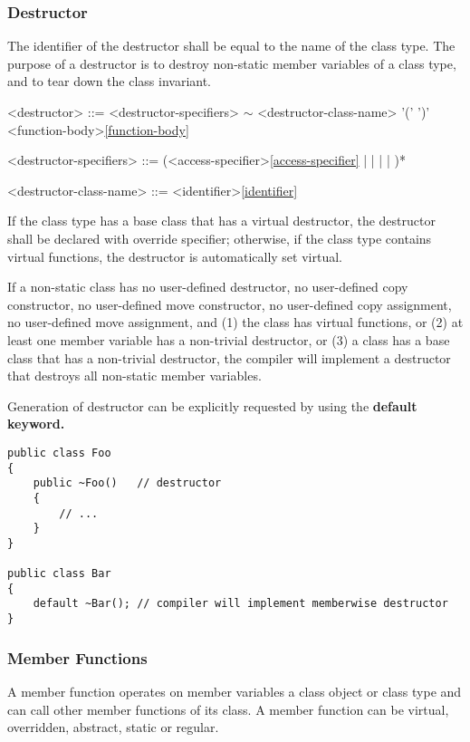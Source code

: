 \documentclass[a4paper,oneside,11pt]{article}
\begin{document}
\subsubsection{Destructor}

The identifier of the destructor shall be equal to the name of the class type.
The purpose of a destructor is to destroy non-static member variables of a class type,
and to tear down the class invariant.

\begin{grammar}
\label{destructor}<destructor> ::= <destructor-specifiers> $\sim$ <destructor-class-name> '(' ')' <function-body>\ref{function-body}

<destructor-specifiers> ::= (<access-specifier>\ref{access-specifier} |  |  |  | )*

<destructor-class-name> ::= <identifier>\ref{identifier}
\end{grammar}

If the class type has a base class that has a virtual destructor, the destructor shall be declared with override specifier;
otherwise, if the class type contains virtual functions, the destructor is automatically set virtual.

If a non-static class has no user-defined destructor,
no user-defined copy constructor, no user-defined move constructor, no user-defined copy assignment, no user-defined move assignment, and
(1) the class has virtual functions,
or (2) at least one member variable has a non-trivial destructor,
or (3) a class has a base class that has a non-trivial destructor,
the compiler will implement a destructor that destroys all non-static member variables.

Generation of destructor can be explicitly requested by using the \bf{default} keyword.

\begin{lstlisting}[frame=trBL]
public class Foo
{
    public ~Foo()   // destructor
    {
        // ...
    }
}

public class Bar
{
    default ~Bar(); // compiler will implement memberwise destructor
}
\end{lstlisting}

\subsubsection{Member Functions}

A member function operates on member variables a class object or class type and can call
other member functions of its class.
A member function can be virtual, overridden, abstract, static or regular.
\end{document}
